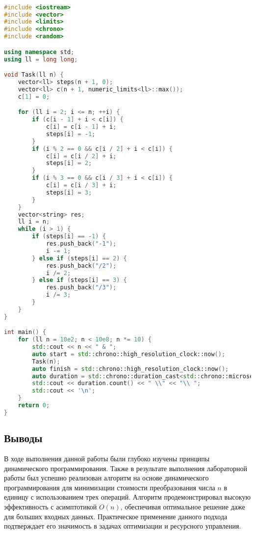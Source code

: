 \documentclass[12pt]{article}
\begin{document}
\begin{lstlisting}[language=C++]

#include <iostream>
#include <vector>
#include <limits>
#include <chrono>
#include <random>

using namespace std;
using ll = long long;

void Task(ll n) {
    vector<ll> steps(n + 1, 0);
    vector<ll> c(n + 1, numeric_limits<ll>::max());
    c[1] = 0; 

    for (ll i = 2; i <= n; ++i) {
        if (c[i - 1] + i < c[i]) {
            c[i] = c[i - 1] + i;
            steps[i] = -1;
        }
        if (i % 2 == 0 && c[i / 2] + i < c[i]) {
            c[i] = c[i / 2] + i;
            steps[i] = 2;
        }
        if (i % 3 == 0 && c[i / 3] + i < c[i]) {
            c[i] = c[i / 3] + i;
            steps[i] = 3;
        }
    }
    vector<string> res;
    ll i = n;
    while (i > 1) {
        if (steps[i] == -1) {
            res.push_back("-1");
            i -= 1;
        } else if (steps[i] == 2) {
            res.push_back("/2");
            i /= 2;
        } else if (steps[i] == 3) {
            res.push_back("/3");
            i /= 3;
        }
    }
}

int main() {
    for (ll n = 10e2; n < 10e8; n *= 10) {
        std::cout << n << " & ";
        auto start = std::chrono::high_resolution_clock::now();
        Task(n);
        auto finish = std::chrono::high_resolution_clock::now();
        auto duration = std::chrono::duration_cast<std::chrono::microseconds>(finish - start);
        std::cout << duration.count() << " \\" << "\\ ";
        std::cout << '\n';
    }
    return 0;
}


\end{lstlisting}

\subsection*{Выводы}

В ходе выполнения данной работы были глубоко изучены принципы динамического программирования. Также в результате выполнения лабораторной работы был успешно реализован алгоритм на основе динамического программирования для минимизации стоимости преобразования числа \( n \) в единицу с использованием трех операций. Алгоритм продемонстрировал высокую эффективность с асимптотикой \( O(n) \), обеспечивая оптимальное решение даже для больших входных данных. Практическое применение данного подхода подтверждает его значимость в задачах оптимизации и ресурсного управления.
\end{document}

